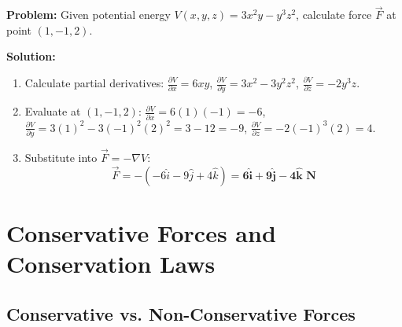 \documentclass[12pt,a4paper]{article}
\begin{document}
\begin{tcolorbox}[examplebox, title={\textbf{Solved Problem 3: Deriving Force from Potential Energy}}]
\textbf{Problem:} Given potential energy $V(x,y,z) = 3x^2 y - y^3 z^2$, calculate force $\vec{F}$ at point $(1, -1, 2)$.

\textbf{Solution:}\par\noindent
\begin{enumerate}[leftmargin=*, itemsep=2pt]
  \item Calculate partial derivatives:
   $\frac{\partial V}{\partial x} = 6x y$, \quad $\frac{\partial V}{\partial y} = 3x^2 - 3y^2 z^2$, \quad $\frac{\partial V}{\partial z} = -2y^3 z$.
  \item Evaluate at $(1, -1, 2)$:
   $\frac{\partial V}{\partial x} = 6(1)(-1) = -6$, \quad $\frac{\partial V}{\partial y} = 3(1)^2 - 3(-1)^2(2)^2 = 3 - 12 = -9$, \quad $\frac{\partial V}{\partial z} = -2(-1)^3(2) = 4$.
  \item Substitute into $\vec{F} = -\nabla V$:
   \begin{equation}
   \vec{F} = -(-6\hat{i} - 9\hat{j} + 4\hat{k}) = \mathbf{6\hat{i} + 9\hat{j} - 4\hat{k} \text{ N}}
   \end{equation}
\end{enumerate}
\end{tcolorbox}

\section{Conservative Forces and Conservation Laws}

\subsection{Conservative vs. Non-Conservative Forces}
\end{document}
